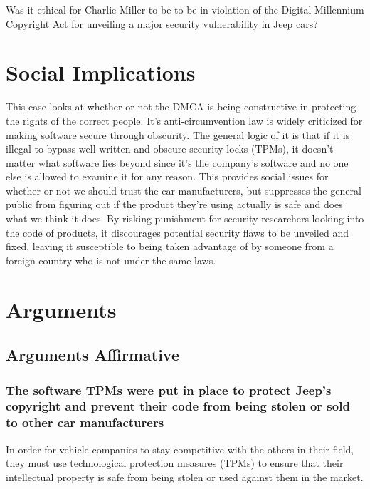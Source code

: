 \documentclass[12pt]{article}
\begin{document}
\begin{multicols}{2}
Was it ethical for Charlie Miller to be to be in violation of the Digital Millennium Copyright Act for unveiling a major security vulnerability in Jeep cars?

\section{Social Implications} 
This case looks at whether or not the DMCA is being constructive in protecting the rights of the correct people. It's anti-circumvention law is widely criticized for making software secure through obscurity. The general logic of it is that if it is illegal to bypass well written and obscure security locks (TPMs), it doesn't matter what software lies beyond since it's the company's software and no one else is allowed to examine it for any reason.\cite{dictionary} This provides social issues for whether or not we should trust the car manufacturers, but suppresses the general public from figuring out if the product they're using actually is safe and does what we think it does. By risking punishment for security researchers looking into the code of products, it discourages potential security flaws to be unveiled and fixed, leaving it susceptible to being taken advantage of by someone from a foreign country who is not under the same laws.\cite{turner}

\section{Arguments}

\subsection{Arguments Affirmative}
\subsubsection{The software TPMs were put in place to protect Jeep's copyright and prevent their code from being stolen or sold to other car manufacturers}

In order for vehicle companies to stay competitive with the others in their field, they must use technological protection measures (TPMs) to ensure that their intellectual property is safe from being stolen or used against them in the market. 
     

\end{multicols}
\end{document}
